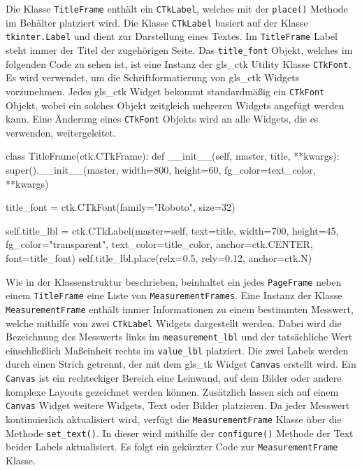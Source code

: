 Die Klasse \lstinline{TitleFrame} enthält ein \lstinline{CTkLabel}, welches mit der \lstinline{place()} Methode im Behälter platziert wird. Die Klasse \lstinline{CTkLabel} basiert auf der Klasse \lstinline{tkinter.Label} und dient zur Darstellung eines Textes. Im \lstinline{TitleFrame} Label steht immer der Titel der zugehörigen Seite. Das \lstinline{title_font} Objekt, welches im folgenden Code zu sehen ist, ist eine Instanz der \gls{gls_ctk} Utility Klasse \lstinline{CTkFont}. Es wird verwendet, um die Schriftformatierung von \gls{gls_ctk} Widgets vorzunehmen. Jedes \gls{gls_ctk} Widget bekommt standardmäßig ein \lstinline{CTkFont} Objekt, wobei ein solches Objekt zeitgleich mehreren Widgets angefügt werden kann. Eine Änderung eines \lstinline{CTkFont} Objekts wird an alle Widgets, die es verwenden, weitergeleitet. \cite[vgl.][]{Schimansky:o.J.}

\begin{pythoncode}
class TitleFrame(ctk.CTkFrame):
	def __init__(self, master, title, **kwargs):
		super().__init__(master, width=800, height=60, fg_color=text_color, **kwargs)
		
		title_font = ctk.CTkFont(family="Roboto", size=32)
		
		self.title_lbl = ctk.CTkLabel(master=self, text=title, width=700, height=45, fg_color="transparent", text_color=title_color, anchor=ctk.CENTER, font=title_font)
		self.title_lbl.place(relx=0.5, rely=0.12, anchor=ctk.N)
\end{pythoncode}


Wie in der Klassenstruktur beschrieben, beinhaltet ein jedes \lstinline{PageFrame} neben einem \lstinline{TitleFrame} eine Liste von \lstinline{MeasurementFrames}. Eine Instanz der Klasse \lstinline{MeasurementFrame} enthält immer Informationen zu einem bestimmten Messwert, welche mithilfe von zwei \lstinline{CTkLabel} Widgets dargestellt werden. Dabei wird die Bezeichnung des Messwerts links im \lstinline{measurement_lbl} und der tatsächliche Wert einschließlich Maßeinheit rechts im \lstinline{value_lbl} platziert. Die zwei Labels werden durch einen Strich getrennt, der mit dem \gls{gls_tk} Widget \lstinline{Canvas} erstellt wird. Ein \lstinline{Canvas} ist ein rechteckiger Bereich \bzw eine Leinwand, auf dem Bilder oder andere komplexe Layouts gezeichnet werden können. Zusätzlich lassen sich auf einem \lstinline{Canvas} Widget \zB weitere Widgets, Text oder Bilder platzieren. \cite[vgl.][20]{Shipman:2013} 
\newline Da jeder Messwert kontinuierlich aktualisiert wird, verfügt die \lstinline{MeasurementFrame} Klasse über die Methode \lstinline{set_text()}. In dieser wird mithilfe der \lstinline{configure()} Methode der Text beider Labels aktualisiert. Es folgt ein gekürzter Code zur \lstinline{MeasurementFrame} Klasse.

